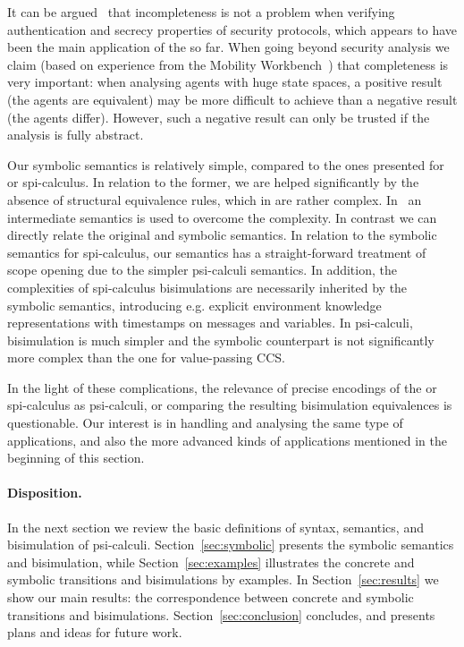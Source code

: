 \documentclass{eptcs}
\theoremstyle{definition}
\begin{document}
It can be argued~\cite{borgstroem.briais.ea:symbolic-bisimulation}
that incompleteness is not a problem when verifying authentication and
secrecy properties of security protocols, which appears to have been the main
application of the \api{} so far.  
When going beyond security analysis we claim (based on experience from the Mobility
Workbench~\cite{victor.moller:mobility-workbench}) that
completeness is very important: when analysing
agents with huge state spaces, a positive result (the agents are
equivalent) may be more difficult to achieve than a negative result
(the agents differ).  However, such a negative result can only be
trusted if the analysis is fully abstract.

Our symbolic semantics is relatively simple, compared to the ones presented for \api{} or spi-calculus. 
In relation to the former, we are helped significantly by the absence
of structural equivalence rules, which in \api{} are rather
complex. In~\cite{DBLP:conf/fsttcs/DelauneKR07} an intermediate
semantics is used to overcome the complexity. In contrast we can directly
relate the original and symbolic semantics.
In relation to the symbolic semantics for spi-calculus, our semantics
has a straight-forward treatment of scope opening due to the simpler
psi-calculi semantics. In addition, the complexities of spi-calculus
bisimulations  are necessarily inherited by the symbolic semantics,
introducing e.g. explicit environment knowledge representations with
timestamps on messages and variables.  In psi-calculi, bisimulation is
much simpler and the symbolic counterpart is not significantly more
complex than the one for value-passing CCS.

In the light of these complications, the relevance of
precise encodings of the \api{} or spi-calculus as psi-calculi,
or comparing the resulting bisimulation equivalences is questionable.
Our interest is
in handling and analysing the same type of applications, and also
the more advanced kinds of applications mentioned in the beginning of this section. 

\paragraph{Disposition.}
In the next section we review the basic definitions of syntax,
semantics, and bisimulation of psi-calculi. Section~\ref{sec:symbolic}
presents the symbolic semantics and bisimulation, while
Section~\ref{sec:examples} illustrates the concrete and symbolic
transitions and bisimulations by examples. In
Section~\ref{sec:results} we show our main results: the correspondence
between concrete and symbolic transitions and
bisimulations. Section~\ref{sec:conclusion} concludes, and presents
plans and ideas for future work.
\end{document}
